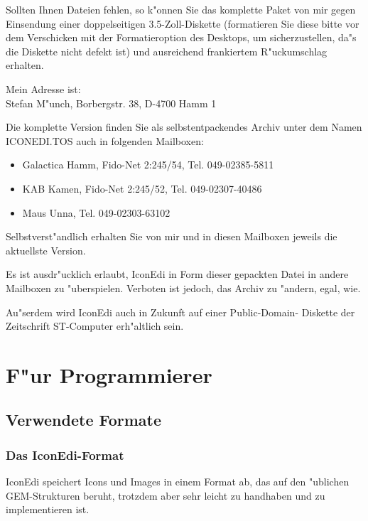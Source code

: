 \begin{appendix}
Sollten Ihnen Dateien fehlen, so k"onnen Sie das komplette
Paket von mir gegen Einsendung einer doppelseitigen
3.5-Zoll-Diskette (formatieren Sie diese bitte vor dem 
Verschicken mit der Formatieroption des Desktops, um 
sicherzustellen, da"s die Diskette nicht defekt ist) und 
ausreichend frankiertem R"uckumschlag erhalten.

Mein Adresse ist: \\
Stefan M"unch, Borbergstr. 38, D-4700 Hamm 1

Die komplette Version finden Sie als selbstentpackendes Archiv 
unter dem Namen ICONEDI.TOS auch in folgenden Mailboxen:
\begin{itemize}
 \item Galactica Hamm, Fido-Net 2:245/54, Tel. 049-02385-5811
 \item KAB Kamen, Fido-Net 2:245/52, Tel. 049-02307-40486
 \item Maus Unna, Tel. 049-02303-63102
\end{itemize}

Selbstverst"andlich erhalten Sie von mir und in diesen Mailboxen
jeweils die aktuellste Version.

Es ist ausdr"ucklich erlaubt, IconEdi in Form dieser gepackten
Datei in andere Mailboxen zu "uberspielen. Verboten ist jedoch,
das Archiv zu "andern, egal, wie. 

Au"serdem wird IconEdi auch in Zukunft auf einer Public-Domain-
Diskette der Zeitschrift ST-Computer erh"altlich sein.


%
\setcounter{chapter}{15}
\chapter{F"ur Programmierer} 
 

\section{Verwendete Formate} 

\subsection{Das IconEdi-Format} 
IconEdi speichert Icons und Images in einem Format ab,
das auf den "ublichen GEM-Strukturen beruht, trotzdem aber
sehr leicht zu handhaben und zu implementieren ist.


\end{appendix}
